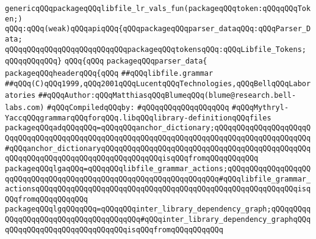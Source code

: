 \label{src/app/makelib/parse/libfile.grammar.pkg}
\verb|genericqQQqpackageqQQqlibfile_lr_vals_fun(packageqQQqtoken:qQQqqQQqToken;)|\newline
\verb|qQQq:qQQq(weak)qQQqapiqQQq{qQQqpackageqQQqparser_dataqQQq:qQQqParser_Data;|\newline
\verb|qQQqqQQqqQQqqQQqqQQqqQQqqQQqpackageqQQqtokensqQQq:qQQqLibfile_Tokens;|\newline
\verb|qQQqqQQqqQQq}|\newline
\verb|qQQq{qQQq|\newline
\verb|packageqQQqparser_data{|\newline
\verb|packageqQQqheaderqQQq{qQQq|\newline
\verb|##qQQqlibfile.grammar|\newline
\verb|##qQQq(C)qQQq1999,qQQq2001qQQqLucentqQQqTechnologies,qQQqBellqQQqLaboratories|\newline
\verb|##qQQqAuthor:qQQqMatthiasqQQqBlumeqQQq(blume@research.bell-labs.com)|\newline
\newline
\verb|#qQQqCompiledqQQqby:|\newline
\verb|#qQQqqQQqqQQqqQQqqQQq|\newline
\newline
\newline
\newline
\verb|#qQQqMythryl-YaccqQQqgrammarqQQqforqQQq.libqQQqlibrary-definitionqQQqfiles|\newline
\newline
\newline
\verb|packageqQQqadqQQqqQQq=qQQqqQQqanchor_dictionary;qQQqqQQqqQQqqQQqqQQqqQQqqQQqqQQqqQQqqQQqqQQqqQQqqQQqqQQqqQQqqQQqqQQqqQQqqQQqqQQqqQQqqQQqqQQq#qQQqanchor_dictionaryqQQqqQQqqQQqqQQqqQQqqQQqqQQqqQQqqQQqqQQqqQQqqQQqqQQqqQQqqQQqqQQqqQQqqQQqqQQqqQQqqQQqisqQQqfromqQQqqQQqqQQq|\newline
\verb|packageqQQqlgaqQQq=qQQqqQQqlibfile_grammar_actions;qQQqqQQqqQQqqQQqqQQqqQQqqQQqqQQqqQQqqQQqqQQqqQQqqQQqqQQqqQQqqQQqqQQq#qQQqlibfile_grammar_actionsqQQqqQQqqQQqqQQqqQQqqQQqqQQqqQQqqQQqqQQqqQQqqQQqqQQqqQQqqQQqisqQQqfromqQQqqQQqqQQq|\newline
\verb|packageqQQqlgqQQqqQQq=qQQqqQQqinter_library_dependency_graph;qQQqqQQqqQQqqQQqqQQqqQQqqQQqqQQqqQQqqQQq#qQQqinter_library_dependency_graphqQQqqQQqqQQqqQQqqQQqqQQqqQQqqQQqisqQQqfromqQQqqQQqqQQq|\newline
